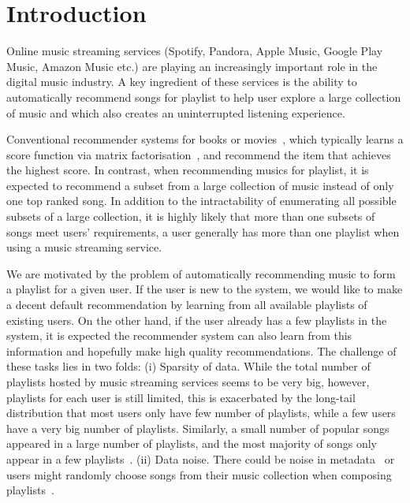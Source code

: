 \section{Introduction}
\label{sec:intro}
Online music streaming services (\eg Spotify, Pandora, Apple Music, Google Play Music, Amazon Music etc.) 
are playing an increasingly important role in the digital music industry.
A key ingredient of these services is the ability to automatically recommend songs for playlist
to help user explore a large collection of music and which also creates an uninterrupted listening experience.

Conventional recommender systems for books or movies~\citep{Sarwar:2001,Netflix},
which typically learns a score function via matrix factorisation~\citep{Koren:2009},
and recommend the item that achieves the highest score.
%
In contrast, when recommending musics for playlist, 
it is expected to recommend a subset from a large collection of music
instead of only one top ranked song.
In addition to the intractability of enumerating all possible subsets of a large collection,
it is highly likely that more than one subsets of songs meet users' requirements,
\eg a user generally has more than one playlist when using a music streaming service.

We are motivated by the problem of automatically recommending music to form a playlist for a given user.
If the user is new to the system, we would like to make a decent default recommendation by learning from 
all available playlists of existing users.
On the other hand, if the user already has a few playlists in the system, it is expected the recommender 
system can also learn from this information and hopefully make high quality recommendations.
The challenge of these tasks lies in two folds:
(i) Sparsity of data. While the total number of playlists hosted by music streaming services seems to be very big,
however, playlists for each user is still limited, this is exacerbated by the long-tail distribution that
most users only have few number of playlists, while a few users have a very big number of playlists.
Similarly, a small number of popular songs appeared in a large number of playlists, and the most majority of songs
only appear in a few playlists~\cite{bonnin2013evaluating}.
(ii) Data noise. There could be noise in metadata~\cite{bonnin2015automated} or users might randomly choose songs 
from their music collection when composing playlists~\cite{mcfee2012hypergraph}.

